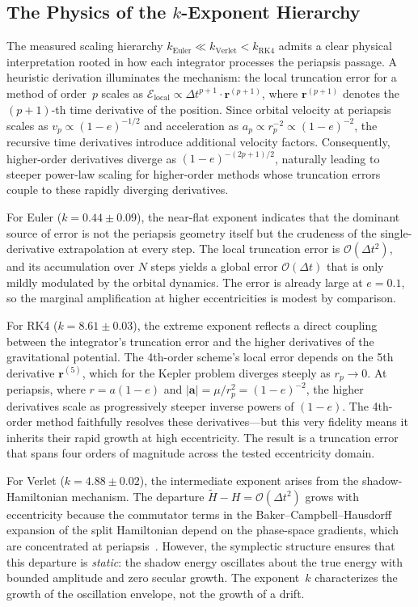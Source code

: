 \documentclass[twocolumn, 10pt]{article}
\begin{document}
\subsection{The Physics of the $k$-Exponent Hierarchy}

The measured scaling hierarchy $k_{\text{Euler}} \ll k_{\text{Verlet}} < k_{\text{RK4}}$ admits a clear physical interpretation rooted in how each integrator processes the periapsis passage. A heuristic derivation illuminates the mechanism: the local truncation error for a method of order~$p$ scales as $\mathcal{E}_{\text{local}} \propto \Delta t^{p+1} \cdot \mathbf{r}^{(p+1)}$, where $\mathbf{r}^{(p+1)}$ denotes the $(p+1)$-th time derivative of the position. Since orbital velocity at periapsis scales as $v_p \propto (1-e)^{-1/2}$ and acceleration as $a_p \propto r_p^{-2} \propto (1-e)^{-2}$, the recursive time derivatives introduce additional velocity factors. Consequently, higher-order derivatives diverge as $(1-e)^{-(2p+1)/2}$, naturally leading to steeper power-law scaling for higher-order methods whose truncation errors couple to these rapidly diverging derivatives.

For Euler ($k = 0.44 \pm 0.09$), the near-flat exponent indicates that the dominant source of error is not the periapsis geometry itself but the crudeness of the single-derivative extrapolation at every step. The local truncation error is $\mathcal{O}(\Delta t^2)$, and its accumulation over $N$ steps yields a global error $\mathcal{O}(\Delta t)$ that is only mildly modulated by the orbital dynamics. The error is already large at $e = 0.1$, so the marginal amplification at higher eccentricities is modest by comparison.

For RK4 ($k = 8.61 \pm 0.03$), the extreme exponent reflects a direct coupling between the integrator's truncation error and the higher derivatives of the gravitational potential. The 4th-order scheme's local error depends on the 5th derivative $\mathbf{r}^{(5)}$, which for the Kepler problem diverges steeply as $r_p \to 0$. At periapsis, where $r = a(1-e)$ and $|\mathbf{a}| = \mu / r_p^2 = (1-e)^{-2}$, the higher derivatives scale as progressively steeper inverse powers of $(1-e)$. The 4th-order method faithfully resolves these derivatives---but this very fidelity means it inherits their rapid growth at high eccentricity. The result is a truncation error that spans four orders of magnitude across the tested eccentricity domain.

For Verlet ($k = 4.88 \pm 0.02$), the intermediate exponent arises from the shadow-Hamiltonian mechanism. The departure $\tilde{H} - H = \mathcal{O}(\Delta t^2)$ grows with eccentricity because the commutator terms in the Baker--Campbell--Hausdorff expansion of the split Hamiltonian depend on the phase-space gradients, which are concentrated at periapsis~\cite{hernandez2016}. However, the symplectic structure ensures that this departure is \textit{static}: the shadow energy oscillates about the true energy with bounded amplitude and zero secular growth. The exponent~$k$ characterizes the growth of the oscillation envelope, not the growth of a drift.
\end{document}
